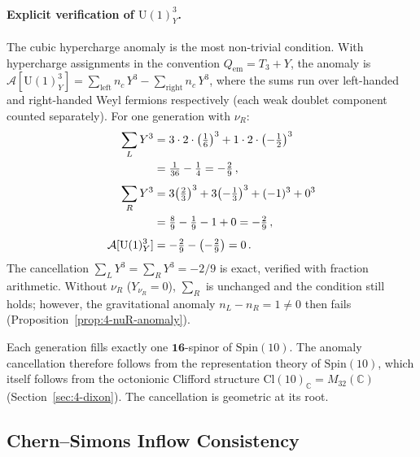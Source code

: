 \paragraph{Explicit verification of $\mathrm{U}(1)_Y^3$.}
The cubic hypercharge anomaly is the most non-trivial condition.  With hypercharge assignments in the convention $Q_{\mathrm{em}} = T_3 + Y$, the anomaly is $\mathcal{A}[\mathrm{U}(1)_Y^3] = \sum_{\mathrm{left}} n_c\, Y^3 - \sum_{\mathrm{right}} n_c\, Y^3$, where the sums run over left-handed and right-handed Weyl fermions respectively (each weak doublet component counted separately).  For one generation with $\nu_R$:
\begin{equation}
\begin{aligned}
  \sum_L Y^3 &= 3 \cdot 2 \cdot \bigl(\tfrac{1}{6}\bigr)^3 + 1 \cdot 2 \cdot \bigl({-}\tfrac{1}{2}\bigr)^3 \notag\\
  &= \tfrac{1}{36} - \tfrac{1}{4}
  = -\tfrac{2}{9}\,, \\[4pt]
  \sum_R Y^3 &= 3\bigl(\tfrac{2}{3}\bigr)^3 + 3\bigl({-}\tfrac{1}{3}\bigr)^3 + (-1)^3 + 0^3 \notag\\
  &= \tfrac{8}{9} - \tfrac{1}{9} - 1 + 0
  = -\tfrac{2}{9}\,, \\[4pt]
  \mathcal{A}[\mathrm{U}(1)_Y^3] &= -\tfrac{2}{9} - \bigl(-\tfrac{2}{9}\bigr) = 0\,.
\end{aligned}
  \label{eq:4-anomaly-explicit}
\end{equation}
The cancellation $\sum_L Y^3 = \sum_R Y^3 = -2/9$ is exact, verified with fraction arithmetic.  Without $\nu_R$ ($Y_{\nu_R} = 0$), $\sum_R$ is unchanged and the condition still holds; however, the gravitational anomaly $n_L - n_R = 1 \neq 0$ then fails (Proposition~\ref{prop:4-nuR-anomaly}).

\begin{remark}
Each generation fills exactly one $\mathbf{16}$-spinor of $\mathrm{Spin}(10)$.  The anomaly cancellation therefore follows from the representation theory of $\mathrm{Spin}(10)$, which itself follows from the octonionic Clifford structure $\mathrm{Cl}(10)_{\mathbb{C}} = M_{32}(\mathbb{C})$ (Section~\ref{sec:4-dixon}).  The cancellation is geometric at its root.
\end{remark}


\subsection{Chern--Simons Inflow Consistency}
\label{sec:4-cs-inflow}

